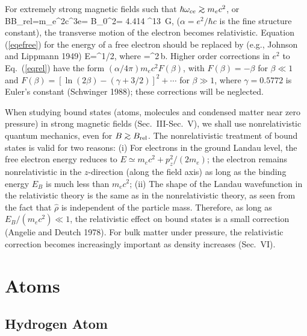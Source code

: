 For extremely strong magnetic fields such that $\hbar\omega_{ce}\go m_ec^2$, or
\be
B\go B_{\rm rel}={m_e^2c^3\over e\hbar}=
{B_0\over \alpha^2}= 4.414 ^{13}~{\rm G},
\ee
($\alpha=e^2/\hbar c$ is the fine structure constant), 
the transverse motion of the electron becomes relativistic. Equation 
(\ref{eqefree}) for the energy of a free electron should be replaced by 
(e.g., Johnson and Lippmann 1949)
\be
E=^{1/2},
\label{eqrel}\ee
where
\be
\beta{}=\alpha^2\,b.
\label{eqrel2}\ee
Higher order corrections in $e^2$ to Eq.~(\ref{eqrel}) have the form
$(\alpha/4\pi)m_ec^2 F(\beta)$, with $F(\beta)=-\beta$ for $\beta\ll 1$ and
$F(\beta)=\left[\ln(2\beta)-(\gamma+3/2)\right]^2+\cdots$ for $\beta\gg 1$,
where $\gamma=0.5772$ is Euler's constant (Schwinger 1988); these corrections
will be neglected.

When studying bound states (atoms, molecules and condensed matter near zero 
pressure) in strong magnetic fields (Sec.~III-Sec.~V), we shall use 
nonrelativistic quantum mechanics, even for $B\go B_{\rm rel}$. 
The nonrelativistic treatment of bound states
is valid for two reasons:
(i) For electrons in the ground Landau level, the free electron energy
reduces to $E\simeq m_ec^2+p_z^2/(2m_e)$; the electron remains 
nonrelativistic in the $z$-direction (along the field axis) as long as the
binding energy $E_B$ is much less than $m_ec^2$; (ii) 
The shape of the Landau wavefunction in the relativistic theory 
is the same as in the nonrelativistic theory, as seen from the fact that 
$\hat\rho$ is independent of the particle mass. 
Therefore, as long as $E_B/(m_e c^2)\ll 1$, the relativistic
effect on bound states is a small correction (Angelie and Deutch 1978).
For bulk matter under pressure, the relativistic correction 
becomes increasingly important as density increases (Sec.~VI).



\section{Atoms}

\subsection{Hydrogen Atom}

